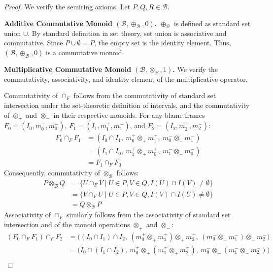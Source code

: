 \documentclass[
]{ceurart}
\theoremstyle{plain}
\begin{document}
\begin{proof}
    We verify the semiring axioms. Let $P, Q, R \in \mathcal{B}$.

    \textbf{Additive Commutative Monoid $(\mathcal{B}, \oplus_\mathcal{B}, 0)$.}
    $\oplus_\mathcal{B}$ is defined as standard set union $\cup$. By standard definition in set theory, set union is associative and commutative. Since $P \cup \emptyset = P$, the empty set is the identity element. Thus, $(\mathcal{B}, \oplus_\mathcal{B}, 0)$ is a commutative monoid.

    \textbf{Multiplicative Commutative Monoid $(\mathcal{B}, \otimes_\mathcal{B}, 1)$.} We verify the commutativity, associativity, and identity element of the multiplicative operator.
    
    Commutativity of $\cap_F$ follows from the commutativity of standard set intersection under the set-theoretic definition of intervals, and the commutativity of $\otimes_{+}$ and $\otimes_{-}$ in their respective monoids. For any blame-frames $F_0 = (I_0, m_0^+, m_0^-)$, $F_1 = (I_1, m_1^+, m_1^-)$, and $F_2 = (I_2, m_2^+, m_2^-)$:
    \begin{align*}
        F_0 \cap_F F_1 
        &= (I_0\cap I_1,\ m_0^+\otimes_{+} m_1^+,\ m_0^-\otimes_{-} m_1^-) \\
        &= (I_1\cap I_0,\ m_1^+\otimes_{+} m_0^+,\ m_1^-\otimes_{-} m_0^-) \\
        &= F_1 \cap_F F_0
    \end{align*}
    Consequently, commutativity of $\otimes_\mathcal{B}$ follows:
    \begin{align*}
        P \otimes_\mathcal{B} Q 
        &= \{U \cap_F V \mid U \in P, V \in Q, I(U) \cap I(V) \neq \emptyset \}\\
        &= \{V \cap_F U \mid U \in P, V \in Q, I(V) \cap I(U) \neq \emptyset \} \\
        &= Q \otimes_\mathcal{B} P 
    \end{align*}
    Associativity of $\cap_F$ similarly follows from the associativity of standard set intersection and of the monoid operations $\otimes_{+}$ and $\otimes_{-}$:
    \begin{align*}
        (F_0 \cap_F F_1) \cap_F F_2
        &= \big( (I_0\cap I_1)\cap I_2,\ (m_0^+\otimes_{+} m_1^+)\otimes_{+} m_2^+,\ (m_0^-\otimes_{-} m_1^-)\otimes_{-} m_2^-\big) \\
        &= \big( I_0\cap (I_1\cap I_2),\ m_0^+\otimes_{+} (m_1^+\otimes_{+} m_2^+),\ m_0^-\otimes_{-} (m_1^-\otimes_{-} m_2^-)\big) \\

\end{align*}
\end{proof}
\end{document}
